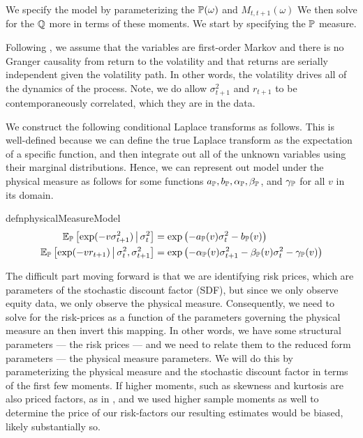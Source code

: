 \documentclass[11pt, letterpaper, twoside, final]{article}
\begin{document}
We specify the model by parameterizing the $\mathbb{P}(\omega)$ and $M_{t, t+1}(\omega)$
We then solve for the $\mathbb{Q}$ more in terms of these moments.
We start by specifying the $\mathbb{P}$ measure.

Following \textcite{khrapov2016affine}, we assume that the variables are first-order Markov and there is no
Granger causality from return to the volatility and that returns are serially independent given the volatility
path.
In other words, the volatility drives all of the dynamics of the process.
Note, we do allow $\sigma^2_{t+1}$ and $r_{t+1}$ to be contemporaneously correlated, which they are in the data. 

We construct the following conditional Laplace transforms as follows.
This is well-defined because we can define the true Laplace transform as the expectation of a specific function,
and then integrate out all of the unknown variables using their marginal distributions.
Hence, we can represent out model under the physical measure as follows for some functions $a_{\mathbb{P}}, b_{\mathbb{P}},
\alpha_{\mathbb{P}}, \beta_{\mathbb{P}}$, and $\gamma_{\mathbb{P}}$ for all $v$ in its domain.


\begin{restatable}{defn}{physicalMeasureModel}
    \label{defn:physical_model}
    \begin{align}
        \operatorname{\mathbb{E}}_{\mathbb{P}} \left[\exp(-v \sigma^2_{t+1}) \,\middle\vert\, \sigma^2_t \right] &= \exp\left( - a_{\mathbb{P}}(v) 
        \sigma^2_t - b_{\mathbb{P}}(v) \right) \\
        \operatorname{\mathbb{E}}_{\mathbb{P}}\left[\exp(-v r_{t+1}) \,\middle\vert\, \sigma^2_t,  \sigma^2_{t+1}\right] &= \exp\left(- \alpha_{\mathbb{P}}(v)
        \sigma^2_{t+1} - \beta_{\mathbb{P}}(v)\sigma^2_t - \gamma_{\mathbb{P}}(v) \right) 
    \end{align}
\end{restatable}


The difficult part moving forward is that we are identifying risk prices, which are  parameters of the stochastic
discount factor (SDF), but since we only observe equity data, we only observe the physical measure.
Consequently, we need to solve for the risk-prices as a function of the parameters governing the physical measure
an then invert this mapping.
In other words, we have some structural parameters --- the risk prices --- and we need to relate them to the
reduced form parameters --- the physical measure parameters.
We will do this by parameterizing the physical measure and the stochastic discount factor in terms of the first
few moments.
If higher moments, such as skewness and kurtosis are also priced factors, as in \textcites{harvey2000conditional,
conrad2012exante, chang2013market},  and we used higher sample moments as well to determine the price of our
risk-factors our resulting estimates would be biased, likely substantially so. 
\end{document}
